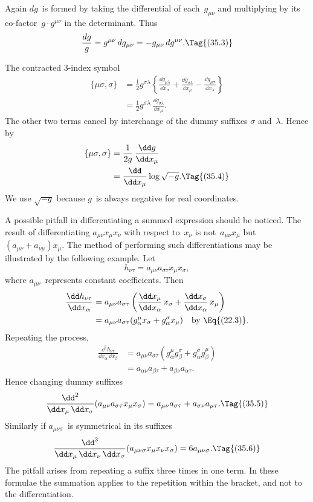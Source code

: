 \documentclass[12pt]{book}
\begin{document}
Again $dg$~is formed by taking the differential of each~$g_{\mu\nu}$ and multiplying
by its co-factor~$g \cdot g^{\mu\nu}$ in the determinant. Thus
\[
\frac{dg}{g} = g^{\mu\nu}\, dg_{\mu\nu} = -g_{\mu\nu}\, dg^{\mu\nu}.
\Tag{(35.3)}
\]

The contracted $3$-index symbol
%
\begin{align*}
  \{\mu\sigma, \sigma\}
  &= \tfrac{1}{2} g^{\sigma\lambda} \left\{
    \frac{\dd g_{\mu\lambda}}{\dd x_{\sigma}}
  + \frac{\dd g_{\sigma\lambda}}{\dd x_{\mu}}
  - \frac{\dd g_{\mu\sigma}}{\dd x_{\lambda}}\right\} \\
  &= \tfrac{1}{2} g^{\sigma\lambda}\, \frac{\dd g_{\sigma\lambda}}{\dd x_{\mu}}.
\end{align*}
The other two terms cancel by interchange of the dummy suffixes $\sigma$ and~$\lambda$.
Hence by~
\begin{align*}
  \{\mu\sigma, \sigma\}
  &= \frac{1}{2g}\, \frac{\dd g}{\dd x_{\mu}} \\
  &= \frac{\dd}{\dd x_{\mu}} \log \sqrt{-g}.
  \Tag{(35.4)}
\end{align*}
We use $\sqrt{-g}$ because $g$~is always negative for real coordinates.

A possible pitfall in differentiating a summed expression should be noticed.
The result of differentiating $a_{\mu\nu} x_{\mu} x_{\nu}$ with respect to~$x_{\nu}$ is not~$a_{\mu\nu} x_{\mu}$ but
$(a_{\mu\nu} + a_{\nu\mu}) x_{\mu}$. The method of performing such differentiations may be illustrated
by the following example. Let
\[
h_{\nu\tau} = a_{\mu\nu} a_{\sigma\tau} x_{\mu} x_{\sigma},
\]
where $a_{\mu\nu}$~represents constant coefficients. Then
\begin{align*}
  \frac{\dd h_{\nu\tau}}{\dd x_{\alpha}}
  &= a_{\mu\nu} a_{\sigma\tau} \left(\frac{\dd x_{\mu}}{\dd x_{\alpha}}\, x_{\sigma} + \frac{\dd x_{\sigma}}{\dd x_{\alpha}}\, x_{\mu}\right) \\
  &= a_{\mu\nu} a_{\sigma\tau} (g_{\alpha}^{\mu} x_{\sigma} + g_{\alpha}^{\sigma} x_{\mu})
  \quad\text{by \Eq{(22.3)}.}
\end{align*}
%
Repeating the process,
\begin{align*}
  \frac{\dd^{2} h_{\nu\tau}}{\dd x_{\alpha}\, \dd x_{\beta}}
  &= a_{\mu\nu} a_{\sigma\tau} (g_{\alpha}^{\mu} g_{\beta}^{\sigma} + g_{\alpha}^{\sigma} g_{\beta}^{\mu}) \\
  &= a_{\alpha\nu} a_{\beta\tau} + a_{\beta\nu} a_{\alpha\tau}.
\end{align*}
Hence changing dummy suffixes
\[
\frac{\dd^{2}}{\dd x_{\mu}\, \dd x_{\sigma}} (a_{\mu\nu} a_{\sigma\tau} x_{\mu} x_{\sigma})
= a_{\mu\nu} a_{\sigma\tau} + a_{\sigma\nu} a_{\mu\tau}.
\Tag{(35.5)}
\]
Similarly if $a_{\mu\nu\sigma}$~is symmetrical in its suffixes
\[
\frac{\dd^{3}}{\dd x_{\mu}\, \dd x_{\nu}\, \dd x_{\sigma}} (a_{\mu\nu\sigma} x_{\mu} x_{\nu} x_{\sigma})
= 6a_{\mu\nu\sigma}.
\Tag{(35.6)}
\]
The pitfall arises from repeating a suffix three times in one term. In these
formulae the summation applies to the repetition within the bracket, and not
to the differentiation.
\end{document}
